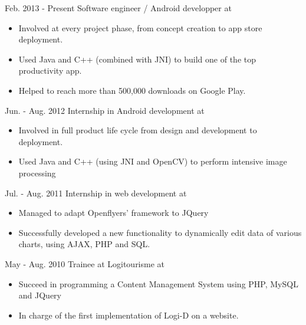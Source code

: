 \cventry
{Feb. 2013 - Present}
{Software engineer / Android developper }
{at }
{}
{}
{
	\begin{itemize}
		\item Involved at every project phase, from concept creation to app store deployment.
		\item Used Java and C++ (combined with JNI) to build one of the top productivity app.
		\item Helped to reach more than 500,000 downloads on Google Play.
	\end{itemize}
}

\cventry
{Jun. - Aug. 2012}
{Internship in Android development}
{at }
{}
{}
{
	\begin{itemize}
		\item Involved in full product life cycle from design and development to deployment.
		\item Used Java and C++ (using JNI and OpenCV) to perform intensive image processing
	\end{itemize}
}

\cventry
{Jul. - Aug. 2011}
{Internship in web development}
{at }
{}
{}
{
	\begin{itemize}
		\item Managed to adapt Openflyers' framework to JQuery
		\item Successfully developed a new functionality to dynamically edit data of various charts, using AJAX, PHP and SQL.
	\end{itemize}
}

\cventry
{May - Aug. 2010}
{Trainee at Logitourisme}
{at }
{}
{}
{
	\begin{itemize}
		\item Succeed in programming a Content Management System using PHP, MySQL and JQuery
		\item In charge of the first implementation of Logi-D on a website. 
	\end{itemize}
}